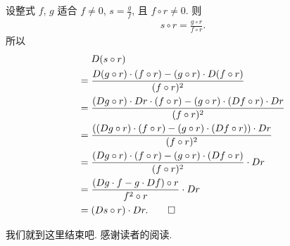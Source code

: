 \begin{pf}
    设整式 $f$, $g$ 适合 $f \neq 0$, $s = \frac{g}{f}$, 且 $f \circ r \neq 0$. 则
    \begin{align*}
        s \circ r = \frac{g \circ r}{f \circ r}.
    \end{align*}
    所以
    \begin{align*}
             & D(s \circ r)                                                                                            \\
        = {} & \frac{D(g \circ r) \cdot (f \circ r) - (g \circ r) \cdot D(f \circ r)}{(f \circ r)^2}                   \\
        = {} & \frac{(Dg \circ r) \cdot Dr \cdot (f \circ r) - (g \circ r) \cdot (Df \circ r) \cdot Dr}{(f \circ r)^2} \\
        = {} & \frac{((Dg \circ r) \cdot (f \circ r) - (g \circ r) \cdot (Df \circ r)) \cdot Dr}{(f \circ r)^2}        \\
        = {} & \frac{(Dg \circ r) \cdot (f \circ r) - (g \circ r) \cdot (Df \circ r)}{(f \circ r)^2} \cdot Dr          \\
        = {} & \frac{(Dg \cdot f - g \cdot Df) \circ r}{f^2 \circ r} \cdot Dr                                          \\
        = {} & (Ds \circ r) \cdot Dr. \qedhere
    \end{align*}
\end{pf}

我们就到这里结束吧. 感谢读者的阅读.
